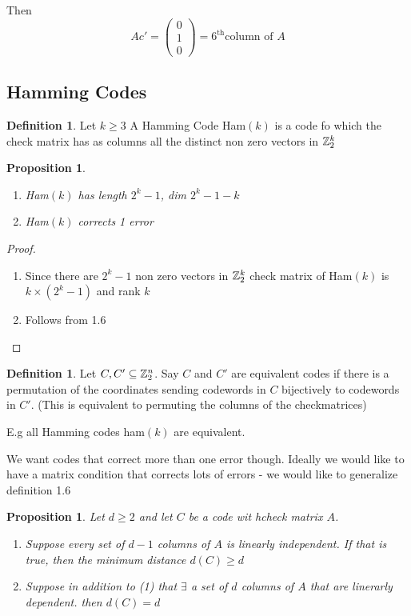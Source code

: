\documentclass[]{amsart}
\newtheorem{prop}[thm]{Proposition}
\theoremstyle{definition}
\newtheorem{defn}[thm]{Definition}
\theoremstyle{remark}
\numberwithin{equation}{section}
\begin{document}
Then \[
	Ac' = \begin{pmatrix}0\\1\\0\end{pmatrix} = 6^\text{th} \text{column of }A
\]

\subsection{Hamming Codes}

\begin{defn}
Let $k\geq3$ A Hamming Code Ham$(k)$ is a code fo which the check matrix has as columns all the distinct non zero vectors in $\mathbb{Z}_2^k$
\end{defn}


\begin{prop}
\begin{enumerate}
	\item Ham$(k)$ has length $2^k-1$, dim $2^k-1 - k$
	\item Ham$(k)$ corrects 1 error
\end{enumerate}
\end{prop}
\begin{proof}
	\par
	\begin{enumerate}
	\item\par
		Since there are $2^k-1$ non zero vectors in $\mathbb{Z}_2^k$ check matrix of Ham$(k)$ is $k\times (2^k-1)$ and rank $k$
	\item\par
		Follows from 1.6 
	\end{enumerate}
\end{proof}

\begin{defn}
Let $C, C' \subseteq \mathbb{Z}_2^n$. Say $C$ and $C'$ are equivalent codes if there is a permutation of the coordinates sending codewords in $C$ bijectively to codewords in $C'$. (This is equivalent to permuting the columns of the checkmatrices)
\end{defn}

E.g all Hamming codes ham$(k)$ are equivalent.

We want codes that correct more than one error though. Ideally we would like to have a matrix condition that corrects lots of errors - we would like to generalize definition 1.6

\begin{prop}
Let $d \geq 2$ and let $C$ be a code wit hcheck matrix $A$. 
\begin{enumerate}
	\item\par Suppose every set of $d-1$ columns of $A$ is linearly independent. If that is true, then the minimum distance $d(C) \geq d$
	\item\par Suppose in addition to (1) that $\exists$ a set of $d$ columns of $A$ that are linerarly dependent. then $d(C) = d$
\end{enumerate}
\end{prop}
\end{document}

